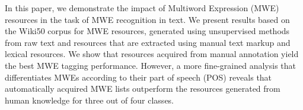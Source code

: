 In this paper, we demonstrate the impact of Multiword Expression (MWE) resources in the task of MWE recognition in text. We present results based on the Wiki50 corpus for MWE resources, generated using unsupervised methods from raw text and resources that are extracted using manual text markup and lexical resources. We show that resources acquired from manual annotation yield the best MWE tagging performance. However, a more fine-grained analysis that differentiates MWEs according to their part of speech (POS) reveals that automatically acquired MWE lists outperform the resources generated from human knowledge for three out of four classes.
